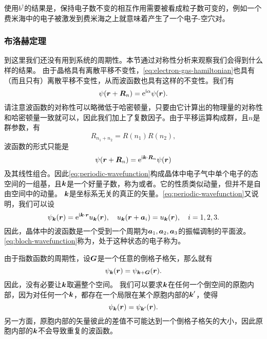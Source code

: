 使用${b}^\dagger$的结果是，保持电子数不变的相互作用需要被看成粒子数可变的，例如一个费米海中的电子被激发到费米海之上就意味着产生了一个电子-空穴对。

\subsubsection{布洛赫定理}\label{sec:bloch-electron}

到这里我们还没有用到系统的周期性。本节通过对称性分析来观察我们会得到什么样的结果。
由于晶格具有离散平移不变性，\eqref{eq:electron-gas-hamiltonian}也具有（而且只有）离散平移不变性，从而波函数也具有这样的不变性。我们有
\[
    \psi(\vb*{r}+\vb*{R}_n) = \mathrm{e}^{\mathrm{i} \alpha} \psi(\vb*{r}).
\]
请注意波函数的对称性可以略微低于哈密顿量，只要由它计算出的物理量的对称性和哈密顿量一致就可以，因此我们加上了复数因子。由于平移运算构成群，且$n$是群参数，有
\[
    R_{n_1+n_2} = R(n_1) R(n_2),
\]
波函数的形式只能是
\begin{equation}
    \psi(\vb*{r}+\vb*{R}_n) = \mathrm{e}^{\mathrm{i} \vb*{k} \cdot \vb*{R}_n} \psi(\vb*{r})
    \label{eq:periodic-wavefunction}
\end{equation}
及其线性组合。因此\eqref{eq:periodic-wavefunction}构成晶体中电子气中单个电子的态空间的一组基，且$\vb*{k}$是一个好量子数，称为或者。它的性质类似动量，但并不是自由空间中的动量。
$\vb*{k}$是坐标系无关的真正的矢量。\eqref{eq:periodic-wavefunction}又说明，我们可以设
\begin{equation}
    \psi_{\vb*{k}}(\vb*{r}) = \mathrm{e}^{\mathrm{i} \vb*{k} \cdot \vb*{r}} u_{\vb*{k}}(\vb*{r}), \quad u_{\vb*{k}}(\vb*{r}+\vb*{a}_i) = u_{\vb*{k}}(\vb*{r}), \quad i = 1, 2, 3.
    \label{eq:bloch-wavefunction}
\end{equation}
因此，晶体中的波函数是一个受到一个周期为$\vb*{a}_1,\vb*{a}_2, \vb*{a}_3$的振幅调制的平面波。
\eqref{eq:bloch-wavefunction}称为，处于这种状态的电子称为。

由于指数函数的周期性，设$\vb*{G}$是一个任意的倒格子格矢，那么就有
\[
    \psi_{\vb*{k}}(\vb*{r}) = \psi_{\vb*{k}+\vb*{G}}(\vb*{r}).
\]
因此，没有必要让$\vb*{k}$取遍整个空间。
我们可以要求$\vb*{k}$在任何一个倒空间的原胞内部，因为对任何一个$\vb*{k}$，都存在一个局限在某个原胞内部的$\vb*{k}'$，使得
\[
    \psi_{\vb*{k}}(\vb*{r}) = \psi_{\vb*{k}'}(\vb*{r}).
\]
另一方面，原胞内部的矢量彼此的差值不可能达到一个倒格子格矢的大小，因此原胞内部的$\vb*{k}$不会导致重复的波函数。

